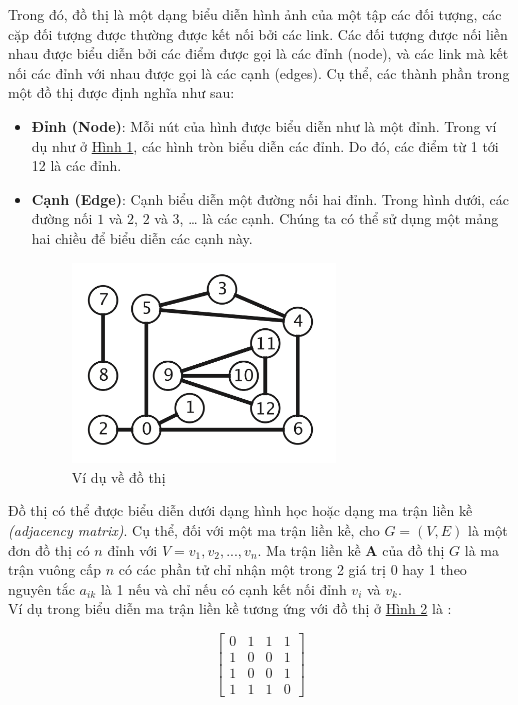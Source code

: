 \documentclass[a4paper]{article}
\begin{document}
Trong đó, đồ thị là một dạng biểu diễn hình ảnh của một tập các đối tượng, các cặp đối tượng được thường được kết nối bởi các link. Các đối tượng được nối liền nhau được biểu diễn bởi các điểm được gọi là các đỉnh (node), và các link mà kết nối các đỉnh với nhau được gọi là các cạnh (edges). Cụ thể, các thành phần trong một đồ thị được định nghĩa như sau:
\begin{itemize}
    \item \textbf{Đỉnh (Node)}: Mỗi nút của hình được biểu diễn như là một đỉnh. Trong ví dụ như ở  \hyperref[fig:g1]{Hình 1}, các hình tròn biểu diễn các đỉnh. Do đó, các điểm từ 1 tới 12 là các đỉnh.
    \item \textbf{Cạnh (Edge)}: Cạnh biểu diễn một đường nối hai đỉnh. Trong hình dưới, các đường nối $1$ và $2$, $2$ và $3$, … là các cạnh. Chúng ta có thể sử dụng một mảng hai chiều để biểu diễn các cạnh này.
        \begin{figure}[!ht]
        \centering
        \includegraphics[width=7cm]{g1.png}
        \caption{Ví dụ về đồ thị}
        \label{fig:g1}
    \end{figure}
\end{itemize}

Đồ thị có thể được biểu diễn dưới dạng hình học hoặc dạng ma trận liền kề \textit{(adjacency matrix)}. Cụ thể, đối với một ma trận liền kề, cho $G = (V, E)$ là một đơn đồ thị có $n$ đỉnh với $V = {v_1, v_2, ..., v_{n}}$. Ma trận liền kề $\mathbf{A}$ của đồ thị $G$ là ma trận vuông cấp $n$ có các phần tử chỉ nhận một trong 2 giá trị 0 hay 1 theo nguyên tắc $a_{ik}$ là 1 nếu và chỉ nếu có cạnh kết nối đỉnh $v_{i}$ và $v_{k}$.\\

Ví dụ trong biểu diễn ma trận liền kề tương ứng với đồ thị ở \hyperref[fig:graph]{Hình 2} là :

$$ \begin{bmatrix}
0 & 1 & 1 & 1 \\
1 & 0 & 0 & 1 \\
1 & 0 & 0 & 1 \\
1 & 1 & 1 & 0 
\end{bmatrix}  $$
\end{document}
